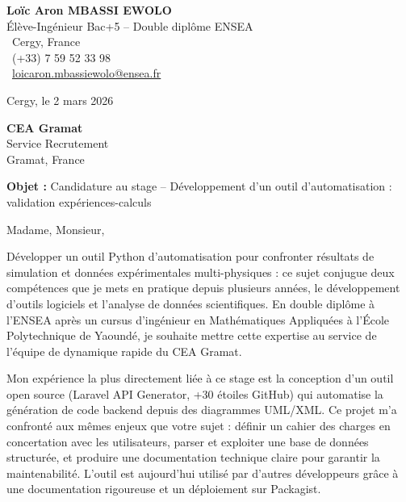 \documentclass[a4paper,11pt]{article}
\begin{document}
\noindent
\begin{minipage}[t]{0.5\textwidth}
    \textbf{Loïc Aron MBASSI EWOLO}\\
    Élève-Ingénieur Bac+5 -- Double diplôme ENSEA\\[3pt]
    \faMapMarker\ Cergy, France\\
    \faPhone\ (+33) 7 59 52 33 98\\
    \faEnvelope\ \href{mailto:loicaron.mbassiewolo@ensea.fr}{loicaron.mbassiewolo@ensea.fr}
\end{minipage}
\hfill
\begin{minipage}[t]{0.4\textwidth}
    \raggedleft
    Cergy, le 2 mars 2026
\end{minipage}

\vspace{1.2cm}

\hfill
\begin{minipage}[t]{0.5\textwidth}
    \raggedleft
    \textbf{CEA Gramat}\\
    Service Recrutement\\
    Gramat, France
\end{minipage}

\vspace{1cm}

\noindent\textbf{Objet :} Candidature au stage -- Développement d'un outil d'automatisation : validation expériences-calculs

\vspace{0.8cm}

Madame, Monsieur,

Développer un outil Python d'automatisation pour confronter résultats de simulation et données expérimentales multi-physiques : ce sujet conjugue deux compétences que je mets en pratique depuis plusieurs années, le développement d'outils logiciels et l'analyse de données scientifiques. En double diplôme à l'ENSEA après un cursus d'ingénieur en Mathématiques Appliquées à l'École Polytechnique de Yaoundé, je souhaite mettre cette expertise au service de l'équipe de dynamique rapide du CEA Gramat.

Mon expérience la plus directement liée à ce stage est la conception d'un outil open source (Laravel API Generator, +30 étoiles GitHub) qui automatise la génération de code backend depuis des diagrammes UML/XML. Ce projet m'a confronté aux mêmes enjeux que votre sujet : définir un cahier des charges en concertation avec les utilisateurs, parser et exploiter une base de données structurée, et produire une documentation technique claire pour garantir la maintenabilité. L'outil est aujourd'hui utilisé par d'autres développeurs grâce à une documentation rigoureuse et un déploiement sur Packagist.
\end{document}
